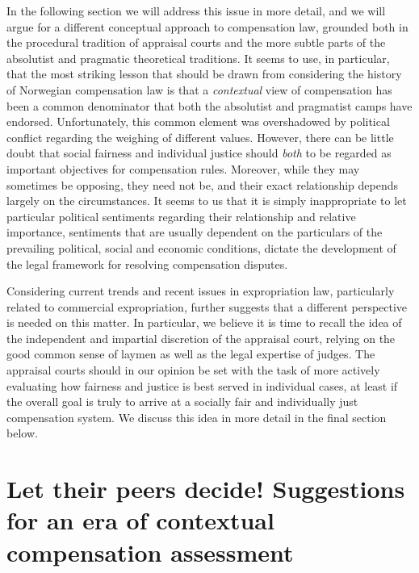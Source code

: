In the following section we will address this issue in more detail, and we will argue for a different conceptual approach to compensation law, grounded both in the procedural tradition of appraisal courts and the more subtle parts of the absolutist and pragmatic theoretical traditions. It seems to use, in particular, that the most striking lesson that should be drawn from considering the history of Norwegian compensation law is that a \emph{contextual} view of compensation has been a common denominator that both the absolutist and pragmatist camps have endorsed. Unfortunately, this common element was overshadowed by political conflict regarding the weighing of different values. However, there can be little doubt that social fairness and individual justice should \emph{both} to be regarded as important objectives for compensation rules. Moreover, while they may sometimes be opposing, they need not be, and their exact relationship depends largely on the circumstances. It seems to us that it is simply inappropriate to let particular political sentiments regarding their relationship and relative importance, sentiments that are usually dependent on the particulars of the prevailing political, social and economic conditions, dictate the development of the legal framework for resolving compensation disputes.

Considering current trends and recent issues in expropriation law, particularly related to commercial expropriation, further suggests that a different perspective is needed on this matter. In particular, we believe it is time to recall the idea of the independent and impartial discretion of the appraisal court, relying on the good common sense of laymen as well as the legal expertise of judges. The appraisal courts should in our opinion be set with the task of more actively evaluating how fairness and justice is best served in individual cases, at least if the overall goal is truly to arrive at a socially fair and individually just compensation system. We discuss this idea in more detail in the final section below.

\section{Let their peers decide! Suggestions for an era of contextual compensation assessment}\label{sec:context}

